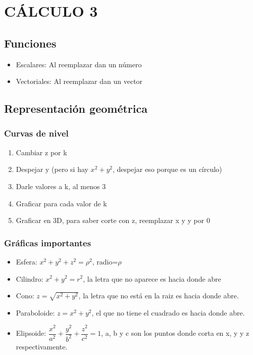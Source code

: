 \section{CÁLCULO 3}

\subsection{Funciones}
\begin{itemize}
	\item Escalares: Al reemplazar dan un número
	\item Vectoriales: Al reemplazar dan un vector
\end{itemize}

\subsection{Representación geométrica}

\subsubsection{Curvas de nivel}
\begin{enumerate}
	\item Cambiar z por k
	\item Despejar y (pero si hay $x^2+y^2$, despejar eso porque es un círculo)
	\item Darle valores a k, al menos 3
	\item Graficar para cada valor de k
	\item Graficar en 3D, para saber corte con z, reemplazar x y y por 0
\end{enumerate}

\subsubsection{Gráficas importantes}
\begin{itemize}
	\item Esfera: $x^2+y^2+z^2=\rho^2$, radio=$\rho$
	\item Cilindro:  $x^2+y^2=r^2$, la letra que no aparece es hacia donde abre
	\item Cono: $ z=\sqrt{x^2+y^2}$, la letra que no está en la raiz es hacia donde abre.
	\item Paraboloide: $ z=x^2+y^2$, el que no tiene el cuadrado es hacia donde abre.
	\item Elipsoide: $\dfrac{x^2}{a^2}+\dfrac{y^2}{b^2}+\dfrac{z^2}{c^2}=1$, a, b y c son los puntos donde corta en x, y y z respectivamente.
\end{itemize}
